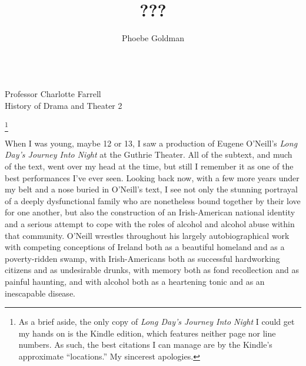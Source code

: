 \documentclass[letterpaper, 12pt]{article}
\title{???}
\author{Phoebe Goldman}
\date{\DTMDate{2020-05-13}}
\newcommand{\ldjin}{\textit{Long Day's Journey Into Night}}
\newcommand{\oneill}{O'Neill}
\newcommand{\theprof}{Professor Charlotte Farrell}
\newcommand{\theclass}{History of Drama and Theater 2}
\newcommand{\mlatitle}{\noindent\theauthor{}\hspace*{2cm}
\\\noindent\theprof{}\hspace*{2cm}
\\\noindent\theclass{}\hspace*{2cm}
\\\noindent\thedate{}\hspace*{2cm}
\begin{center}
  \thetitle{}
\end{center}}
\begin{document}
\RaggedRight
\thispagestyle{plain}

\mlatitle{}

\footnote{As a brief aside, the only copy of \ldjin{} I could get my hands on
  is the Kindle edition, which features neither page nor line numbers. As such,
  the best citations I can manage are by the Kindle's approximate
  \enquote{locations.} My sincerest apologies.}

When I was young, maybe 12 or 13, I saw a production of Eugene \oneill{}'s
\ldjin{} at the Guthrie Theater. All of the subtext, and much of the text, went
over my head at the time, but still I remember it as one of the best
performances I've ever seen. Looking back now, with a few more years under my
belt and a nose buried in \oneill{}'s text, I see not only the stunning
portrayal of a deeply dysfunctional family who are nonetheless bound together
by their love for one another, but also the construction of an Irish-American
national identity and a serious attempt to cope with the roles of alcohol and
alcohol abuse within that community. \oneill{} wrestles throughout his largely
autobiographical work with competing conceptions of Ireland both as a beautiful
homeland and as a poverty-ridden swamp, with Irish-Americans both as successful
hardworking citizens and as undesirable drunks, with memory both as fond
recollection and as painful haunting, and with alcohol both as a heartening
tonic and as an inescapable disease.
\end{document}
